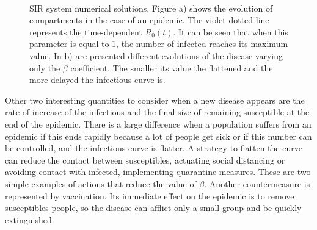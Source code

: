 \begin{figure}[h]
	\centering
	 \quad
	 \\
	\caption[SIR dynamic example]{SIR system numerical solutions. Figure a) shows the evolution of compartments in the case of an epidemic. The violet dotted line represents the time-dependent $R_0(t)$. It can be seen that when this parameter is equal to $1$, the number of infected reaches its maximum value. In b) are presented different evolutions of the disease varying only the $\beta$ coefficient. The smaller its value the flattened and the more delayed the infectious curve is.}
	\label{fig:sir_example}
\end{figure}
Other two interesting quantities to consider when a new disease appears are the rate of increase of the infectious and the final size of remaining susceptible at the end of the epidemic. There is a large difference when a population suffers from an epidemic if this ends rapidly because a lot of people get sick or if this number can be controlled, and the infectious curve is flatter. A strategy to flatten the curve can reduce the contact between susceptibles, actuating social distancing or avoiding contact with infected, implementing quarantine measures. These are two simple examples of actions that reduce the value of $\beta$. Another countermeasure is represented by vaccination. Its immediate effect on the epidemic is to remove susceptibles people, so the disease can afflict only a small group and be quickly extinguished. 

